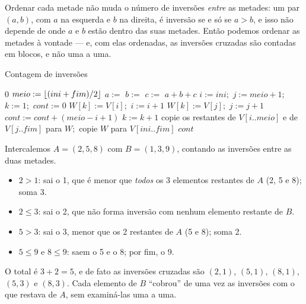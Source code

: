 \begin{intuicao}
Ordenar cada metade não muda o número de inversões \emph{entre} as metades: um par $(a,b)$, com $a$ na esquerda e $b$ na direita, é inversão se e só se $a>b$, e isso não depende de onde $a$ e $b$ estão dentro das suas metades. Então podemos ordenar as metades à vontade --- e, com elas ordenadas, as inversões cruzadas são contadas em blocos, e não uma a uma.
\end{intuicao}

\begin{pseudo}{Contagem de inversões}
\begin{algorithmic}
 
   \State \Return $0$ \EndIf
  \State $meio:=\lfloor(ini+fim)/2\rfloor$
  \State $a:=$ 
  \State $b:=$ 
  \State $c:=$ 
  \State \Return $a+b+c$
\EndFunction
{}
  \State $i:=ini$;\ $j:=meio+1$;\ $k:=1$;\ $cont:=0$
     \State $W[k]:=V[i]$;\ $i:=i+1$
    \Else
      \State $W[k]:=V[j]$;\ $j:=j+1$
      \State $cont:=cont+(meio-i+1)$ 
    \EndIf
    \State $k:=k+1$
  \EndWhile
  \State copie os restantes de $V[i..meio]$ e de $V[j..fim]$ para $W$;\ copie $W$ para $V[ini..fim]$
  \State \Return $cont$
\EndFunction
\end{algorithmic}
\end{pseudo}

\begin{exemplo}\label{ex:intercont}
Intercalemos $A=(2,5,8)$ com $B=(1,3,9)$, contando as inversões entre as duas metades.
\begin{itemize}
  \item $2>1$: sai o 1, que é menor que \emph{todos} os 3 elementos restantes de $A$ (2, 5 e 8); soma 3.
  \item $2\le3$: sai o 2, que não forma inversão com nenhum elemento restante de $B$.
  \item $5>3$: sai o 3, menor que os 2 restantes de $A$ (5 e 8); soma 2.
  \item $5\le9$ e $8\le9$: saem o 5 e o 8; por fim, o 9.
\end{itemize}
O total é $3+2=5$, e de fato as inversões cruzadas são $(2,1)$, $(5,1)$, $(8,1)$, $(5,3)$ e $(8,3)$. Cada elemento de $B$ ``cobrou'' de uma vez as inversões com o que restava de $A$, sem examiná-las uma a uma.
\end{exemplo}

